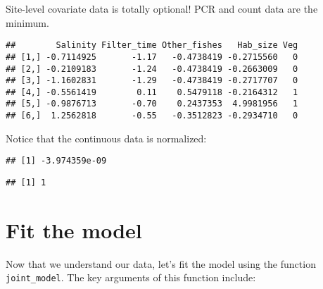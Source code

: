 \documentclass[
]{article}
\newenvironment{Shaded}{\begin{snugshade}}{\end{snugshade}}
\newcommand{\FunctionTok}[1]{\textcolor[rgb]{0.13,0.29,0.53}{\textbf{#1}}}
\newcommand{\NormalTok}[1]{#1}
\newcommand{\SpecialCharTok}[1]{\textcolor[rgb]{0.81,0.36,0.00}{\textbf{#1}}}
\newcommand{\StringTok}[1]{\textcolor[rgb]{0.31,0.60,0.02}{#1}}
\begin{document}
Site-level covariate data is totally optional! PCR and count data are
the minimum.

\begin{Shaded}
\end{Shaded}

\begin{verbatim}
##        Salinity Filter_time Other_fishes   Hab_size Veg
## [1,] -0.7114925       -1.17   -0.4738419 -0.2715560   0
## [2,] -0.2109183       -1.24   -0.4738419 -0.2663009   0
## [3,] -1.1602831       -1.29   -0.4738419 -0.2717707   0
## [4,] -0.5561419        0.11    0.5479118 -0.2164312   1
## [5,] -0.9876713       -0.70    0.2437353  4.9981956   1
## [6,]  1.2562818       -0.55   -0.3512823 -0.2934710   0
\end{verbatim}

Notice that the continuous data is normalized:

\begin{Shaded}
\end{Shaded}

\begin{verbatim}
## [1] -3.974359e-09
\end{verbatim}

\begin{Shaded}
\end{Shaded}

\begin{verbatim}
## [1] 1
\end{verbatim}

\section{Fit the model}\label{fit-the-model}

Now that we understand our data, let's fit the model using the function
\texttt{joint\_model}. The key arguments of this function include:
\end{document}
